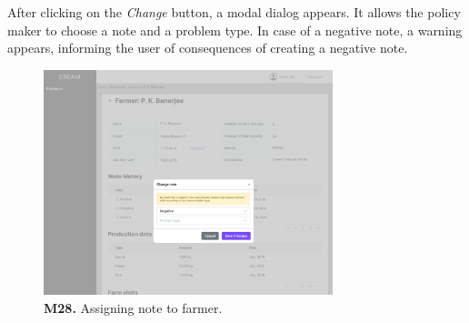     After clicking on the \textit{Change} button, a modal dialog appears. It allows the policy maker to choose a note and a problem type. In case of a negative note, a warning appears, informing the user of consequences of creating a negative note.
    \begin{figure}[H]
        \centering
        \includegraphics[width=0.75\textwidth]{mockups/Policy maker_Dashboard_Farmers_Farmer_Note_1.png}
        \caption{\textbf{M28.} Assigning note to farmer.}
    \end{figure}
